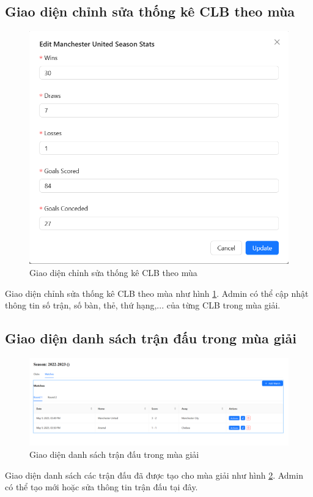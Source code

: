\documentclass[../BTL.tex]{subfiles}
\begin{document}
\subsection{Giao diện chỉnh sửa thống kê CLB theo mùa}
\begin{figure}
    \centering
    \includegraphics[width=1\linewidth]{Hinhve/admin_edit_club_season_v2.png}
    \caption{Giao diện chỉnh sửa thống kê CLB theo mùa}
    \label{fig:admin_edit_club_season}
\end{figure}
Giao diện chỉnh sửa thống kê CLB theo mùa như hình \ref{fig:admin_edit_club_season}. Admin có thể cập nhật thông tin số trận, số bàn, thẻ, thứ hạng,... của từng CLB trong mùa giải.


\subsection{Giao diện danh sách trận đấu trong mùa giải}
\begin{figure}
    \centering
    \includegraphics[width=1\linewidth]{Hinhve/admin_matches.png}
    \caption{Giao diện danh sách trận đấu trong mùa giải}
    \label{fig:admin_matches}
\end{figure}
Giao diện danh sách các trận đấu đã được tạo cho mùa giải như hình \ref{fig:admin_matches}. Admin có thể tạo mới hoặc sửa thông tin trận đấu tại đây.
\end{document}
